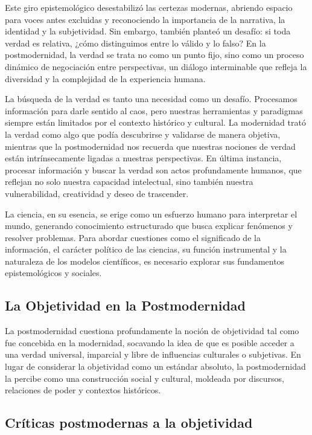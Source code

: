 \documentclass[
  letterpaper,
  DIV=11,
  numbers=noendperiod]{scrreprt}
\begin{document}
Este giro epistemológico desestabilizó las certezas modernas, abriendo
espacio para voces antes excluidas y reconociendo la importancia de la
narrativa, la identidad y la subjetividad. Sin embargo, también planteó
un desafío: si toda verdad es relativa, ¿cómo distinguimos entre lo
válido y lo falso? En la postmodernidad, la verdad se trata no como un
punto fijo, sino como un proceso dinámico de negociación entre
perspectivas, un diálogo interminable que refleja la diversidad y la
complejidad de la experiencia humana.

La búsqueda de la verdad es tanto una necesidad como un desafío.
Procesamos información para darle sentido al caos, pero nuestras
herramientas y paradigmas siempre están limitados por el contexto
histórico y cultural. La modernidad trató la verdad como algo que podía
descubrirse y validarse de manera objetiva, mientras que la
postmodernidad nos recuerda que nuestras nociones de verdad están
intrínsecamente ligadas a nuestras perspectivas. En última instancia,
procesar información y buscar la verdad son actos profundamente humanos,
que reflejan no solo nuestra capacidad intelectual, sino también nuestra
vulnerabilidad, creatividad y deseo de trascender.

La ciencia, en su esencia, se erige como un esfuerzo humano para
interpretar el mundo, generando conocimiento estructurado que busca
explicar fenómenos y resolver problemas. Para abordar cuestiones como el
significado de la información, el carácter político de las ciencias, su
función instrumental y la naturaleza de los modelos científicos, es
necesario explorar sus fundamentos epistemológicos y sociales.

\subsection{La Objetividad en la
Postmodernidad}\label{la-objetividad-en-la-postmodernidad}

La postmodernidad cuestiona profundamente la noción de objetividad tal
como fue concebida en la modernidad, socavando la idea de que es posible
acceder a una verdad universal, imparcial y libre de influencias
culturales o subjetivas. En lugar de considerar la objetividad como un
estándar absoluto, la postmodernidad la percibe como una construcción
social y cultural, moldeada por discursos, relaciones de poder y
contextos históricos.

\subsection{Críticas postmodernas a la
objetividad}\label{cruxedticas-postmodernas-a-la-objetividad}
\end{document}
